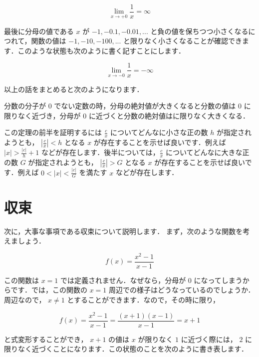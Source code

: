 \documentclass[
  letterpaper,
  DIV=11,
  numbers=noendperiod]{scrreprt}
\begin{document}
\[ \lim_{x\to +0}\frac{1}{x}=\infty\]

最後に分母の値である \(x\) が \(-1,-0.1,-0.01,...\)
と負の値を保ちつつ小さくなるにつれて，関数の値は \(-1,-10,-100,...\)
と限りなく小さくなることが確認できます．このような状態も次のように書く記すことにします．

\[ \lim_{x\to -0}\frac{1}{x}=-\infty\]

以上の話をまとめると次のようになります．

\begin{tcolorbox}[enhanced jigsaw, colbacktitle=quarto-callout-note-color!10!white, opacitybacktitle=0.6, breakable, opacityback=0, titlerule=0mm, leftrule=.75mm, arc=.35mm, colback=white, bottomrule=.15mm, toprule=.15mm, rightrule=.15mm, coltitle=black, left=2mm, colframe=quarto-callout-note-color-frame, toptitle=1mm, title={定理}, bottomtitle=1mm]

分数の分子が \(0\) でない定数の時，分母の絶対値が大きくなると分数の値は
\(0\) に限りなく近づき，分母が \(0\)
に近づくと分数の絶対値はに限りなく大きくなる．

\end{tcolorbox}

この定理の前半を証明するには \(\frac{c}{x}\)
についてどんなに小さな正の数 \(h\) が指定されようとも，
\(|\frac{c}{x}|<h\) となる \(x\) が存在することを示せば良いです．例えば
\(|x|>\frac{|c|}{h}+1\)
などが存在します．後半については，\(\frac{c}{x}\)
についてどんなに大きな正の数 \(G\) が指定されようとも，
\(|\frac{c}{x}| > G\) となる \(x\)
が存在することを示せば良いです．例えば \(0<|x|<\frac{|c|}{G}\) を満たす
\(x\) などが存在します．

\hypertarget{ux53ceux675f}{%
\section{収束}\label{ux53ceux675f}}

次に，大事な事項である収束について説明します．
まず，次のような関数を考えましょう．

\[f(x) = \frac{x^2-1}{x-1}\]

この関数は \(x=1\) では定義されません．なぜなら，分母が \(0\)
になってしまうからです．では，この関数の \(x=1\)
周辺での様子はどうなっているのでしょうか．周辺なので， \(x\neq 1\)
とすることができます．なので，その時に限り，

\[f(x) = \frac{x^2-1}{x-1}=\frac{(x+1)(x-1)}{x-1}=x+1\]

と式変形することができ， \(x+1\) の値は \(x\) が限りなく \(1\)
に近づく際には， \(2\)
に限りなく近づくことになります．この状態のことを次のように書き表します．
\end{document}

